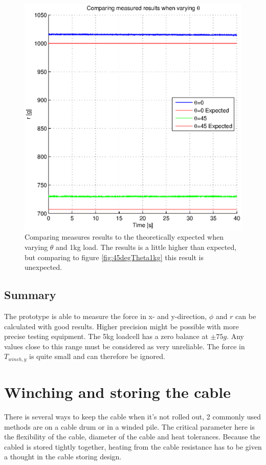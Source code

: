 \begin{figure}[H]
\centering
\includegraphics[scale=1]{graphics/gcs_test/Theta1kgCable.eps}
\caption{Comparing measures results to the theoretically expected when varying $\theta$ and 1kg load. The results is a little higher than expected, but comparing to figure \ref{fig:45degTheta1kg} this result is unexpected.}
\end{figure}




\subsection{Summary}
The prototype is able to measure the force in x- and y-direction, $\phi$ and $r$ can be calculated with good results. Higher precision might be possible with more precise testing equipment.
The 5kg loadcell has a zero balance at $\pm75g$. Any values close to this range must be considered as very unreliable. 
The force in $T_{winch,y}$ is quite small and can therefore be ignored.




\section{Winching and storing the cable}
There is several ways to keep the cable when it's not rolled out, 2 commonly used methods are on a cable drum or in a winded pile. The critical parameter here is the flexibility of the cable, diameter of the cable and heat tolerances.  Because the cabled is stored tightly together, heating from the cable resistance has to be given a thought in the cable storing design.

